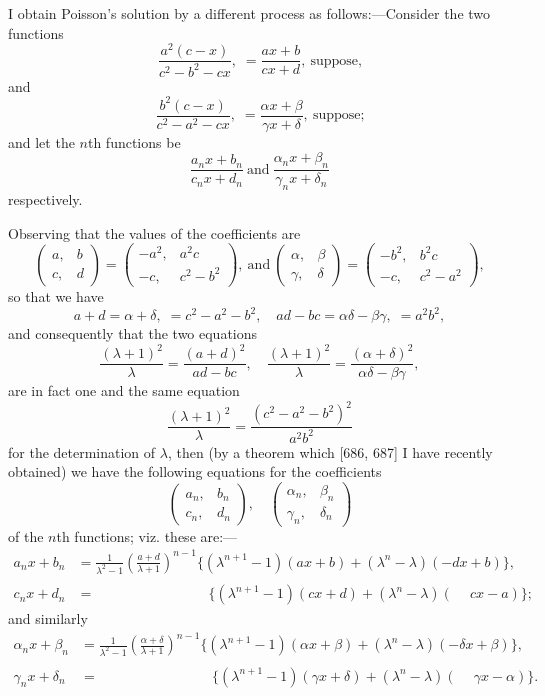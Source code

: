 \documentclass[11pt,a4paper]{book}
\begin{document}
I obtain Poisson's solution by a different process as follows:---Consider the two functions
\[
\frac{a^2(c-x)}{c^2-b^2-cx},\; =\frac{ax+b}{cx+d},\ \text{suppose,}
\]
and
\[
\frac{b^2(c-x)}{c^2-a^2-cx},\; =\frac{\alpha x+\beta}{\gamma x+\delta},\ \text{suppose;}
\]
and let the $n$th functions be
\[
\frac{a_n x + b_n}{c_n x + d_n}\ \text{and}\ \frac{\alpha_n x + \beta_n}{\gamma_n x + \delta_n}
\]
respectively.

Observing that the values of the coefficients are
\[
\begin{pmatrix} a, & b \\ c, & d \end{pmatrix}
= \begin{pmatrix} -a^2, & a^2 c \\ -c, & c^2-b^2 \end{pmatrix},\ \text{and}\ 
\begin{pmatrix} \alpha, & \beta \\ \gamma, & \delta \end{pmatrix}
= \begin{pmatrix} -b^2, & b^2 c \\ -c, & c^2-a^2 \end{pmatrix},
\]
so that we have
\[
a+d = \alpha+\delta,\; = c^2-a^2-b^2,\quad ad-bc = \alpha\delta-\beta\gamma,\; = a^2b^2,
\]
and consequently that the two equations
\[
\frac{(\lambda+1)^2}{\lambda} = \frac{(a+d)^2}{ad-bc},\quad
\frac{(\lambda+1)^2}{\lambda} = \frac{(\alpha+\delta)^2}{\alpha\delta-\beta\gamma},
\]
are in fact one and the same equation
\[
\frac{(\lambda+1)^2}{\lambda} = \frac{(c^2-a^2-b^2)^2}{a^2b^2}
\]
for the determination of $\lambda$, then (by a theorem which [686, 687] I have recently obtained) we have the following equations for the coefficients
\[
\begin{pmatrix} a_n, & b_n \\ c_n, & d_n \end{pmatrix},\quad
\begin{pmatrix} \alpha_n, & \beta_n \\ \gamma_n, & \delta_n \end{pmatrix}
\]
of the $n$th functions; viz. these are:---
\begin{align*}
a_n x + b_n &= \frac{1}{\lambda^2-1}\left(\frac{a+d}{\lambda+1}\right)^{n-1}
\{ (\lambda^{n+1}-1)(ax+b) + (\lambda^n-\lambda)(-dx+b) \},\\
c_n x + d_n &= \phantom{\frac{1}{\lambda^2-1}\left(\frac{a+d}{\lambda+1}\right)^{n-1}}
\;\;\;\{ (\lambda^{n+1}-1)(cx+d) + (\lambda^n-\lambda)(\phantom{-}cx-a) \};
\end{align*}
and similarly
\begin{align*}
\alpha_n x + \beta_n &= \frac{1}{\lambda^2-1}\left(\frac{\alpha+\delta}{\lambda+1}\right)^{n-1}
\{ (\lambda^{n+1}-1)(\alpha x+\beta) + (\lambda^n-\lambda)(-\delta x+\beta) \},\\
\gamma_n x + \delta_n &= \phantom{\frac{1}{\lambda^2-1}\left(\frac{\alpha+\delta}{\lambda+1}\right)^{n-1}}
\;\;\;\{ (\lambda^{n+1}-1)(\gamma x+\delta) + (\lambda^n-\lambda)(\phantom{-}\gamma x-\alpha) \}.
\end{align*}
\end{document}
